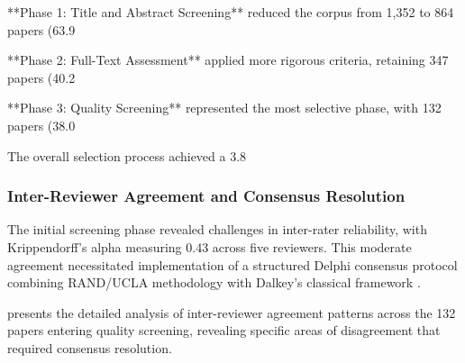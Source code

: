 \documentclass[acmsmall]{acmart}
\begin{document}
**Phase 1: Title and Abstract Screening** reduced the corpus from 1,352 to 864 papers (63.9%

**Phase 2: Full-Text Assessment** applied more rigorous criteria, retaining 347 papers (40.2%

**Phase 3: Quality Screening** represented the most selective phase, with 132 papers (38.0%

The overall selection process achieved a 3.8%

\subsubsection{Inter-Reviewer Agreement and Consensus Resolution}\label{subsubsec:phase-2-literature-search-and-study-selection:inter-reviewer-agreement-and-consensus-resolution}

The initial screening phase revealed challenges in inter-rater reliability, with Krippendorff's alpha measuring 0.43 across five reviewers. This moderate agreement necessitated implementation of a structured Delphi consensus protocol combining RAND/UCLA methodology \citep{fitch2001rand} with Dalkey's classical framework \citep{dalkey1969delphi}.

 presents the detailed analysis of inter-reviewer agreement patterns across the 132 papers entering quality screening, revealing specific areas of disagreement that required consensus resolution.
\end{document}
